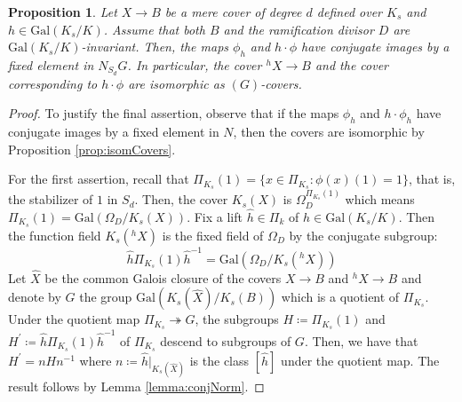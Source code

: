 \documentclass[10pt]{amsart}
\newtheorem{proposition}[theorem]{Proposition}
\theoremstyle{definition}
\newcommand{\Gal}{{ \mathrm{Gal}}}
\begin{document}
\begin{proposition}\label{prop:gal_action_monodromy}
Let $X\rightarrow B$ be a mere cover of degree $d$ defined over $K_s$ and $h \in\Gal(K_s/K)$. Assume that both $B$ and the ramification divisor $D$ are $\Gal(K_s/K)$-invariant. 
Then, the maps $\phi_h$ and $h\cdot \phi$ have conjugate images by a fixed element in $ N_{S_d}G$. In particular, the cover $^h \! X \to B$ and the cover corresponding to $h\cdot \phi$ are isomorphic as $(G)$-covers.
\end{proposition}

\begin{proof}
To justify the final assertion, observe that if the maps $\phi_h$ and $h \cdot \phi_h$ have conjugate images by a fixed element in $N$, then the covers are isomorphic by Proposition \ref{prop:isomCovers}. 

For the first assertion, recall that $\Pi_{K_s}(1)= \{x \in \Pi_{K_s}: \phi(x)(1)=1 \}$, that is, the stabilizer of $1$ in $S_d$. Then, the cover $K_s(X)$ is $\Omega_D^{\Pi_{K_s}(1)}$ which means  $\Pi_{K_s}(1) =\Gal(\Omega_D/K_s(X))$. 
Fix a lift $\hat{h} \in \Pi_k$ of $h \in \Gal(K_s /K)$. 
Then the function field $K_s(^h \! X)$ is the fixed field of $\Omega_D$ by the conjugate subgroup:
$$\hat h \Pi_{K_s}(1) \hat h^{-1} = \Gal(\Omega_D/K_s(^h \! X))$$ 
Let $\hat{X}$ be the common Galois closure of the covers $X \to B$ and $ {^h X} \rightarrow B$ and denote by $G$ the group $\Gal(K_s(\hat{X})/K_s(B))$ which is a quotient of $\Pi_{K_s}$.
Under the quotient map $\Pi_{K_s} \twoheadrightarrow G$, the subgroups $H \coloneqq \Pi_{K_s}(1)$ and $ H^\prime \coloneqq \hat h \Pi_{K_s}(1) \hat h^{-1}$ of $\Pi_{K_s}$ descend to subgroups of $G$. Then, we have that $H^\prime  = n H n^{-1}$ where $n \coloneqq \hat{h}|_{K_s(\hat{X})}$ is the class $[\hat{h}]$ under the quotient map.
 The result follows by Lemma \ref{lemma:conjNorm}.
\end{proof}
\end{document}
